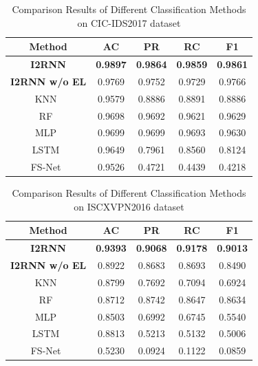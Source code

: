 \begin{table}[htbp]
\centering
\caption{Comparison Results of Different Classification Methods on CIC-IDS2017 dataset}
\label{tab:classification_ids}
\begin{tabular}{|c|c|c|c|c|} 
\hline
Method       & AC     & PR     & RC     & F1     \\
\hline
\textbf{I2RNN}        & \textbf{0.9897} & \textbf{0.9864} & \textbf{0.9859} & \textbf{0.9861} \\
\textbf{I2RNN w/o EL} & 0.9769 & 0.9752 & 0.9729 & 0.9766 \\
\hline
KNN~\cite{mcgaughey2018systematic}          & 0.9579 & 0.8886 & 0.8891 & 0.8886 \\
RF~\cite{zhai2018random}           & 0.9698 & 0.9692 & 0.9621 & 0.9629 \\
MLP~\cite{aceto2018mobile}          & 0.9699 & 0.9699 & 0.9693 & 0.9630 \\
LSTM~\cite{vu2018time}         & 0.9649 & 0.7961 & 0.8560 & 0.8124 \\
FS-Net~\cite{liu2019fs}       & 0.9526 & 0.4721 & 0.4439 & 0.4218 \\
\hline
\end{tabular}
\end{table}

\begin{table}[htbp]
\centering
\caption{Comparison Results of Different Classification Methods on ISCXVPN2016 dataset}
\label{tab:classification_vpn}
\begin{tabular}{|c|c|c|c|c|}
\hline
Method       & AC     & PR     & RC     & F1     \\
\hline
\textbf{I2RNN}        & \textbf{0.9393} & \textbf{0.9068} & \textbf{0.9178} & \textbf{0.9013} \\
\textbf{I2RNN w/o EL} & 0.8922 & 0.8683 & 0.8693 & 0.8490 \\
\hline
KNN~\cite{mcgaughey2018systematic}          & 0.8799 & 0.7692 & 0.7094 & 0.6924 \\
RF~\cite{zhai2018random}           & 0.8712 & 0.8742 & 0.8647 & 0.8634 \\
MLP~\cite{aceto2018mobile}          & 0.8503 & 0.6992 & 0.6745 & 0.5540 \\
LSTM~\cite{vu2018time}         & 0.8813 & 0.5213 & 0.5132 & 0.5006 \\
FS-Net~\cite{liu2019fs}       & 0.5230 & 0.0924 & 0.1122 & 0.0859 \\
\hline
\end{tabular}
\end{table}

